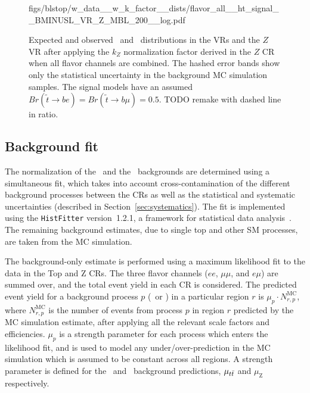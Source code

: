 \begin{figure}
{      {figs/blstop/w_data__w_k_factor__dists/flavor_all__ht_signal__BMINUSL_VR_Z_MBL_200__log.pdf}
  }
  \caption{Expected and observed \MBL\ and \HT\ distributions in the
    VRs and the $Z$ VR after applying the $k_Z$ normalization factor derived
    in the $Z$ CR when all flavor channels are combined.
    The hashed error bands show only the statistical uncertainty in the
    background MC simulation samples.
    The signal models have an assumed
    $Br(\tilde{t}\rightarrow be) = Br(\tilde{t}\rightarrow b\mu) = 0.5$.
    {\color{red} TODO remake with dashed line in ratio.}
  }
  \label{fig:vr_dists_w_norm_factor}
\end{figure}





\FloatBarrier
\subsection{Background fit}
\label{sec:bkg_fit}

The normalization of the \TTBAR\ and the \ZGAMMAJETS\ backgrounds are
determined using a simultaneous fit, which takes into account
cross-contamination of the different background processes between the
CRs as well as the statistical and systematic uncertainties (described in
Section~\ref{sec:systematics}).
The fit is implemented using the \texttt{HistFitter} version~1.2.1, a framework
for statistical data analysis~\cite{Baak:2014wma}.
The remaining background estimates, due to  single top and other SM processes,
are taken from the MC simulation.

The background-only estimate is performed using a maximum likelihood fit
to the data in the Top and Z CRs.
The three flavor channels ($ee$, $\mu\mu$, and $e\mu$) are summed over, and the
total event yield in each CR is considered.
The predicted event yield for a background process $p$ (\TTBAR\ or \ZGAMMAJETS)
in a particular region $r$ is $\mu_{p} \cdot N_{r,p}^\mathrm{MC}$, where
$N_{r,p}^\mathrm{MC}$ is the number of events from process $p$ in region $r$
predicted by the MC simulation estimate, after applying all the relevant
scale factors and efficiencies.
$\mu_{p}$ is a strength parameter for each process which enters the likelihood
fit, and is used to model any under/over-prediction in the MC simulation
which is assumed to be constant across all regions.
A strength parameter is defined for the \TTBAR\ and \ZGAMMAJETS\ background
predictions, $\mu_{t\bar{t}}$ and $\mu_\mathrm{Z}$ respectively.

